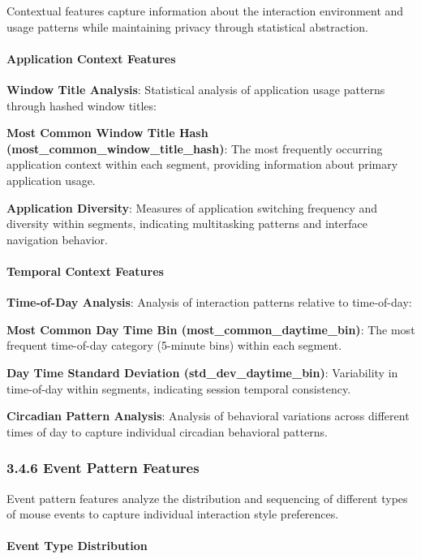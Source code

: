 \documentclass[
  11pt,
  a4paper,
]{article}
\begin{document}
Contextual features capture information about the interaction
environment and usage patterns while maintaining privacy through
statistical abstraction.

\paragraph{Application Context
Features}\label{application-context-features}

\textbf{Window Title Analysis}: Statistical analysis of application
usage patterns through hashed window titles:

\textbf{Most Common Window Title Hash
(most\_common\_window\_title\_hash)}: The most frequently occurring
application context within each segment, providing information about
primary application usage.

\textbf{Application Diversity}: Measures of application switching
frequency and diversity within segments, indicating multitasking
patterns and interface navigation behavior.

\paragraph{Temporal Context Features}\label{temporal-context-features}

\textbf{Time-of-Day Analysis}: Analysis of interaction patterns relative
to time-of-day:

\textbf{Most Common Day Time Bin (most\_common\_daytime\_bin)}: The most
frequent time-of-day category (5-minute bins) within each segment.

\textbf{Day Time Standard Deviation (std\_dev\_daytime\_bin)}:
Variability in time-of-day within segments, indicating session temporal
consistency.

\textbf{Circadian Pattern Analysis}: Analysis of behavioral variations
across different times of day to capture individual circadian behavioral
patterns.

\subsubsection{3.4.6 Event Pattern
Features}\label{event-pattern-features}

Event pattern features analyze the distribution and sequencing of
different types of mouse events to capture individual interaction style
preferences.

\paragraph{Event Type Distribution}\label{event-type-distribution}
\end{document}
